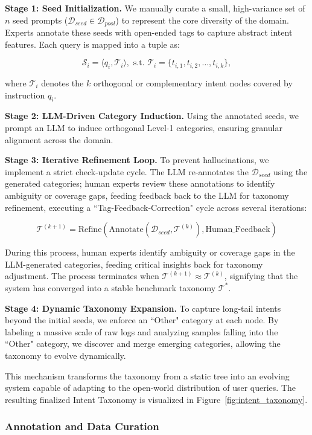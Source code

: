 {\textbf{Stage 1: Seed Initialization.}} We manually curate a small, high-variance set of $n$ seed prompts ($\mathcal{D}_{seed} \in \mathcal{D}_{pool}$) to represent the core diversity of the domain. Experts annotate these seeds with open-ended tags to capture abstract intent features. Each query is mapped into a tuple as:

$$\mathcal{S}_i = \langle q_i, \mathcal{T}_i \rangle, \text{ s.t. } \mathcal{T}_i = \{t_{i,1}, t_{i,2}, \dots, t_{i,k}\},$$

where $\mathcal{T}_i$ denotes the $k$ orthogonal or complementary intent nodes covered by instruction $q_i$.

{\textbf{Stage 2: LLM-Driven Category Induction.}} Using the annotated seeds, we prompt an LLM to induce orthogonal Level-1 categories, ensuring granular alignment across the domain.

{\textbf{Stage 3: Iterative Refinement Loop.}} To prevent hallucinations, we implement a strict check-update cycle. The LLM re-annotates the $\mathcal{D}_{seed}$ using the generated categories; human experts review these annotations to identify ambiguity or coverage gaps, feeding feedback back to the LLM for taxonomy refinement, executing a ``Tag-Feedback-Correction" cycle across several iterations:

$$\mathcal{T}^{(k+1)} = \text{Refine}\left( \text{Annotate}(\mathcal{D}_{seed}, \mathcal{T}^{(k)}), \text{Human\_Feedback} \right)$$

During this process, human experts identify ambiguity or coverage gaps in the LLM-generated categories, feeding critical insights back for taxonomy adjustment. The process terminates when $\mathcal{T}^{(k+1)} \approx \mathcal{T}^{(k)}$, signifying that the system has converged into a stable benchmark taxonomy $\mathcal{T}^*$.

{\textbf{Stage 4: Dynamic Taxonomy Expansion.}} To capture long-tail intents beyond the initial seeds, we enforce an ``Other" category at each node. By labeling a massive scale of raw logs and analyzing samples falling into the ``Other" category, we discover and merge emerging categories, allowing the taxonomy to evolve dynamically.


This mechanism transforms the taxonomy from a static tree into an evolving system capable of adapting to the open-world distribution of user queries. The resulting finalized Intent Taxonomy is visualized in Figure~\ref{fig:intent_taxonomy}.

\subsubsection{Annotation and Data Curation}


